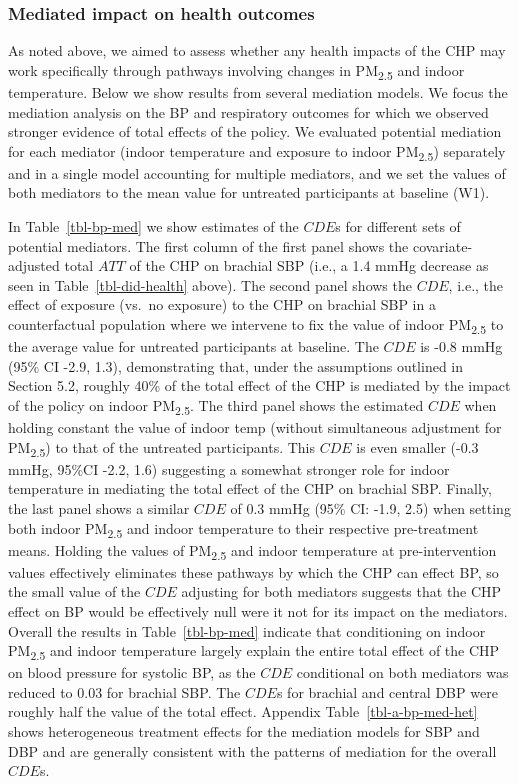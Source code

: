\documentclass[
  letterpaper,
  DIV=11,
  numbers=noendperiod]{scrartcl}
\begin{document}
\subsubsection{Mediated impact on health
outcomes}\label{mediated-impact-on-health-outcomes}

As noted above, we aimed to assess whether any health impacts of the CHP
may work specifically through pathways involving changes in
PM\textsubscript{2.5} and indoor temperature. Below we show results from
several mediation models. We focus the mediation analysis on the BP and
respiratory outcomes for which we observed stronger evidence of total
effects of the policy. We evaluated potential mediation for each
mediator (indoor temperature and exposure to indoor
PM\textsubscript{2.5}) separately and in a single model accounting for
multiple mediators, and we set the values of both mediators to the mean
value for untreated participants at baseline (W1).

In Table~\ref{tbl-bp-med} we show estimates of the \(CDE\)s for
different sets of potential mediators. The first column
of the first panel shows the covariate-adjusted total \(ATT\) of the CHP
on brachial SBP (i.e., a 1.4 mmHg decrease as seen in
Table~\ref{tbl-did-health} above). The second panel shows the \(CDE\),
i.e., the effect of exposure (vs.~no exposure) to the CHP on brachial
SBP in a counterfactual population where we intervene to fix the value
of indoor PM\textsubscript{2.5} to the average value for untreated
participants at baseline. The \(CDE\) is -0.8 mmHg (95\% CI -2.9, 1.3),
demonstrating that, under the assumptions outlined in Section 5.2,
roughly 40\% of the total effect of the CHP is mediated by the impact of
the policy on indoor PM\textsubscript{2.5}. The third panel shows the
estimated \(CDE\) when holding constant the value of indoor temp
(without simultaneous adjustment for PM\textsubscript{2.5}) to that of
the untreated participants. This \(CDE\) is even smaller (-0.3 mmHg,
95\%CI -2.2, 1.6) suggesting a somewhat stronger role for indoor
temperature in mediating the total effect of the CHP on brachial SBP.
Finally, the last panel shows a similar \(CDE\) of 0.3 mmHg (95\% CI:
-1.9, 2.5) when setting both indoor PM\textsubscript{2.5} and indoor
temperature to their respective pre-treatment means. Holding the values
of PM\textsubscript{2.5} and indoor temperature at pre-intervention
values effectively eliminates these pathways by which the CHP can effect
BP, so the small value of the \(CDE\) adjusting for both mediators
suggests that the CHP effect on BP would be effectively null were it not
for its impact on the mediators. Overall the results in
Table~\ref{tbl-bp-med} indicate that conditioning on indoor
PM\textsubscript{2.5} and indoor temperature largely explain the entire
total effect of the CHP on blood pressure for systolic BP, as the
\(CDE\) conditional on both mediators was reduced to 0.03 for brachial
SBP. The \(CDE\)s for brachial and central DBP were roughly half the
value of the total effect. Appendix Table~\ref{tbl-a-bp-med-het} shows
heterogeneous treatment effects for the mediation models for SBP and DBP
and are generally consistent with the patterns of mediation for the
overall \(CDE\)s.
\end{document}
